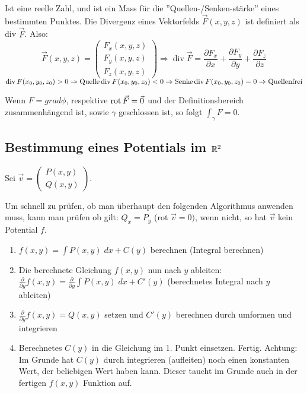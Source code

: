 \begin{definition}[Divergenz]
Ist eine reelle Zahl, und ist ein Mass für die ''Quellen-/Senken-stärke'' eines bestimmten Punktes. 
Die Divergenz eines Vektorfelds $\vec{F}(x, y, z)$ ist definiert als div $\vec{F}$. Also:
\[
\vec{F} (x, y, z) = 
\left(
	\begin{array}{c}
		F_x (x, y, z) \\
		F_y (x, y, z) \\
		F_z (x, y, z)
	\end{array}
\right) \Rightarrow
	\operatorname{div} \vec{F} = \frac{\partial F_x}{\partial x} + \frac{\partial F_y}{\partial y} + 
	\frac{\partial F_z}{\partial z}
\] 
$
\operatorname{div} F(x_0, y_0, z_0) > 0 \Rightarrow \text{Quelle}\\
\operatorname{div} F(x_0, y_0, z_0) < 0 \Rightarrow \text{Senke}\\
\operatorname{div} F(x_0, y_0, z_0) = 0 \Rightarrow \text{Quellenfrei}
$
\end{definition}

\begin{lemma}
Wenn $F = grad \phi$, respektive $\operatorname{rot} \vec{F} =\vec{0}$ und der Definitionsbereich zusammenhängend ist,
sowie $\gamma$ geschlossen ist, so folgt $\int_\gamma F = 0$.
\end{lemma}
\pagebreak
\subsection{Bestimmung eines Potentials im $\mathbb{R}^2$}
Sei $\vec{v} = \begin{pmatrix}
P(x,y)\\
Q(x,y)
\end{pmatrix}$.

Um schnell zu prüfen, ob man überhaupt den folgenden Algorithmus anwenden muss,
kann man prüfen ob gilt: $Q_x = P_y$ (rot $\vec{v} = 0)$, wenn nicht, so hat $\vec{v}$ kein Potential $f$.

\begin{enumerate}[itemsep=1em]
	\item $f(x,y) = \int P(x,y)\;dx + C(y)$ berechnen (Integral berechnen)
	\item Die berechnete Gleichung $f(x,y)$ nun nach $y$ ableiten:
	$\frac{\partial}{\partial y} f(x,y) = \frac{\partial}{\partial y}\int P(x,y)\;dx + C'(y)$
	(berechnetes Integral nach $y$ ableiten)
	\item $\frac{\partial}{\partial y} f(x,y) = Q(x,y)$ setzen und $C'(y)$ berechnen durch umformen
	und integrieren
	\item Berechnetes $C(y)$ in die Gleichung im 1. Punkt einsetzen. Fertig. Achtung: Im Grunde hat
	$C(y)$ durch integrieren (aufleiten) noch einen konstanten Wert, der beliebigen Wert haben kann.
	Dieser taucht im Grunde auch in der fertigen $f(x,y)$ Funktion auf.
\end{enumerate}

